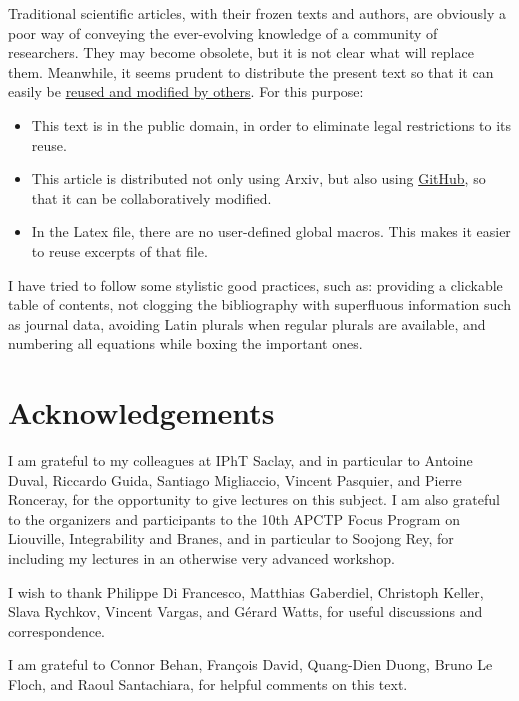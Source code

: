 \documentclass[12pt, a4paper, notitlepage, twoside]{report}
\numberwithin{equation}{section}
\theoremstyle{break}
\begin{document}
Traditional scientific articles, with their frozen texts and authors, are obviously a poor way of conveying the ever-evolving knowledge of a community of researchers.
They may become obsolete, but it is not clear what will replace them.
Meanwhile, it seems prudent to distribute the present text so that it can easily be 
\href{http://researchpracticesandtools.blogspot.fr/2014/02/the-case-for-emancipating-articles-from.html}
{reused and modified by others}.
For this purpose:
\begin{itemize}
 \item This text is in the public domain, in order to eliminate legal restrictions to its reuse. 
\item This article is distributed not only using Arxiv, but also using \href{https://github.com/ribault/CFT-Review}{GitHub}, so that it can be collaboratively modified. 
\item In the Latex file, there are no user-defined global macros.
This makes it easier to reuse excerpts of that file. 
\end{itemize}

I have tried to follow some stylistic good practices, such as: providing a clickable table of contents, not clogging the bibliography with superfluous information such as journal data, avoiding Latin plurals when regular plurals are available, and numbering all equations while boxing the important ones. 


\section{Acknowledgements}

I am grateful to my colleagues at IPhT Saclay, and in particular to Antoine Duval, Riccardo Guida, Santiago Migliaccio, Vincent Pasquier, and Pierre Ronceray, for the opportunity to give lectures on this subject. I am also grateful to the organizers and participants to the 10th APCTP Focus Program on Liouville, Integrability and Branes, and in particular to Soojong Rey, for including my lectures in an otherwise very advanced workshop. 

I wish to thank Philippe Di Francesco, Matthias Gaberdiel, Christoph Keller, Slava Rychkov, Vincent Vargas, and G\'erard Watts, for useful discussions and correspondence.

I am grateful to Connor Behan, Fran\c{c}ois David, Quang-Dien Duong, Bruno Le Floch, and Raoul Santachiara, for helpful comments on this text.
\end{document}
